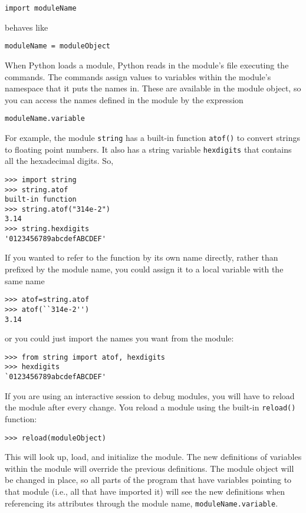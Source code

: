 \begin{verbatim}
import moduleName
\end{verbatim}

behaves like

\begin{verbatim}
moduleName = moduleObject
\end{verbatim}

When Python loads a module, Python
reads in the module's file executing the commands. The commands assign
values to variables within the module's namespace that it puts the names
in. These are available in the module object, so you can access the
names defined in the module by the expression

\begin{verbatim}
moduleName.variable
\end{verbatim}

For example, the module
\texttt{string} has a built-in function \texttt{atof()} to convert strings
to floating point numbers. It also has a string variable
\texttt{hexdigits} that contains all the hexadecimal digits. So,


\begin{verbatim}
>>> import string
>>> string.atof
built-in function
>>> string.atof("314e-2")
3.14
>>> string.hexdigits
'0123456789abcdefABCDEF'
\end{verbatim}

If you wanted to refer to the
function by its own name directly, rather than prefixed by the module
name, you could assign it to a local variable with the same name


\begin{verbatim}
>>> atof=string.atof
>>> atof(``314e-2'')
3.14
\end{verbatim}

or you could just import the names
you want from the module:

\begin{verbatim}
>>> from string import atof, hexdigits
>>> hexdigits
`0123456789abcdefABCDEF'
\end{verbatim}

If you are using an interactive
session to debug modules, you will have to reload the module after every
change. You reload a module using the built-in \texttt{reload()} function:

\begin{verbatim}
>>> reload(moduleObject)
\end{verbatim}

This will look up, load, and
initialize the module. The new definitions of variables within the
module will override the previous definitions. The module object will be
changed in place, so all parts of the program that have variables
pointing to that module (i.e., all that have imported it) will see the
new definitions when referencing its attributes through the module name,
\texttt{moduleName.variable}.

